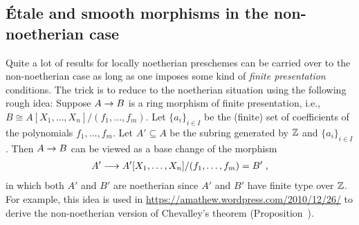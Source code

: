 \documentclass[a4paper,parskip=half,numbers=enddot, DIV=12]{scrreprt}
\begin{document}
\subsection{Étale and smooth morphisms in the non-noetherian case}
Quite a lot of results for locally noetherian preschemes can be carried over to the non-noetherian case as long as one imposes some kind of \emph{finite presentation} conditions. The trick is to reduce to the noetherian situation using the following rough idea: Suppose $A\morphism B$ is a ring morphism of finite presentation, i.e., $B\cong A[X_1,\ldots,X_n]/(f_1,\ldots,f_m)$. Let $\{a_i\}_{i\in I}$ be the (finite) set of coefficients of the polynomials $f_1,\ldots,f_m$. Let $A'\subseteq A$ be the subring generated by $\mathbb{Z}$ and $\{a_i\}_{i\in I}$. Then $A\morphism B$ can be viewed as a base change of the morphism
\begin{align*}
A'\morphism A'[X_1,\ldots,X_n]/(f_1,\ldots,f_m)=B'\;,
\end{align*}
in which both $A'$ and $B'$ are noetherian since $A'$ and $B'$ have finite type over $\mathbb{Z}$. For example, this idea is used in \url{https://amathew.wordpress.com/2010/12/26/} to derive the non-noetherian version of Chevalley's theorem (Proposition~).
\end{document}
